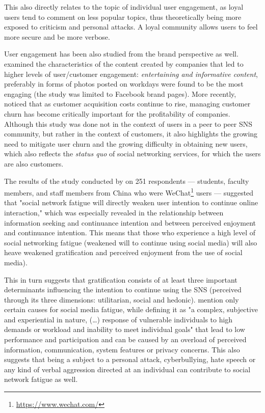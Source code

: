 \documentclass[a4paper,fleqn]{cas-dc}
\begin{document}
This also directly relates to the topic of individual user engagement, as loyal users tend to comment on less popular topics, thus theoretically being more exposed to criticism and personal attacks. A loyal community allows users to feel more secure and  be more verbose.


User engagement  has been also studied from the brand perspective as well. \citet{cvijikj2013online} examined the characteristics of the content created by companies that led to higher levels of user/customer engagement: \textit{entertaining and informative content}, preferably in forms of photos posted on workdays were found to be the most engaging (the study was limited to Facebook brand pages). 
More recently, \citet{lemmens2020managing} noticed that as customer acquisition costs continue to rise, managing customer churn has become critically important for the profitability of companies. Although this study was done not in the context of users in a peer to peer SNS community, but rather in the context of customers, it also highlights the growing need to mitigate user churn and the growing difficulty in obtaining new users, which also reflects the \textit{status quo} of social networking services, for which the users are also customers.

The results of the study conducted by \citet{zong2019social} on 251 respondents --- students, faculty members, and staff members from China who were WeChat\footnote{\url{https://www.wechat.com/}} users --- suggested that "social network fatigue will directly weaken user intention to continue online interaction," which was especially revealed in the relationship between information seeking and continuance intention and between perceived enjoyment and continuance intention. This means that those who experience a high level of social networking fatigue (weakened will to continue using social media) will also heave weakened gratification and perceived enjoyment from the use of  social media). 

This in turn suggests that gratification consists of at least 
three important determinants influencing the intention to continue using the SNS (perceived through its three dimensions: utilitarian, social and hedonic).   \citet{zong2019social} mention only certain causes for social media fatigue, while defining it as "a complex, subjective and experiential in nature, (\dots) response of vulnerable individuals to high demands or workload and inability to meet individual goals" that lead to low performance and participation and can be caused by an overload of perceived information, communication, system features or privacy concerns. This also suggests that being a subject to a personal attack, cyberbullying, hate speech or any kind of verbal aggression directed at an individual can contribute to social network fatigue as well.
\end{document}
